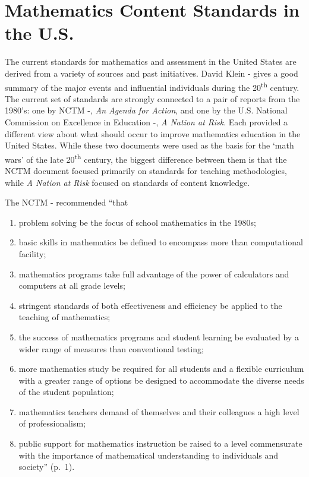 \documentclass[
]{book}
\theoremstyle{definition}
\theoremstyle{definition}
\theoremstyle{definition}
\theoremstyle{definition}
\theoremstyle{remark}
\begin{document}
\hypertarget{mathematics-content-standards-in-the-u.s.}{%
\section{Mathematics Content Standards in the U.S.}\label{mathematics-content-standards-in-the-u.s.}}

The current standards for mathematics and assessment in the United States are derived from a variety of sources and past initiatives. David Klein -\citet{Klein2003} gives a good summary of the major events and influential individuals during the 20\textsuperscript{th} century. The current set of standards are strongly connected to a pair of reports from the 1980's: one by NCTM -\citet{NCTM1980}, \emph{An Agenda for Action}, and one by the U.S. National Commission on Excellence in Education -\citet{NCEE1983}, \emph{A Nation at Risk}. Each provided a different view about what should occur to improve mathematics education in the United States. While these two documents were used as the basis for the `math wars' of the late 20\textsuperscript{th} century, the biggest difference between them is that the NCTM document focused primarily on standards for teaching methodologies, while \emph{A Nation at Risk} focused on standards of content knowledge.

The NCTM -\citet{NCTM1980} recommended ``that

\begin{enumerate}
\def\labelenumi{\arabic{enumi}.}
\item
  problem solving be the focus of school mathematics in the 1980s;
\item
  basic skills in mathematics be defined to encompass more than computational facility;
\item
  mathematics programs take full advantage of the power of calculators and computers at all grade levels;
\item
  stringent standards of both effectiveness and efficiency be applied to the teaching of mathematics;
\item
  the success of mathematics programs and student learning be evaluated by a wider range of measures than conventional testing;
\item
  more mathematics study be required for all students and a flexible curriculum with a greater range of options be designed to accommodate the diverse needs of the student population;
\item
  mathematics teachers demand of themselves and their colleagues a high level of professionalism;
\item
  public support for mathematics instruction be raised to a level commensurate with the importance of mathematical understanding to individuals and society'' (p.~1).
\end{enumerate}
\end{document}
